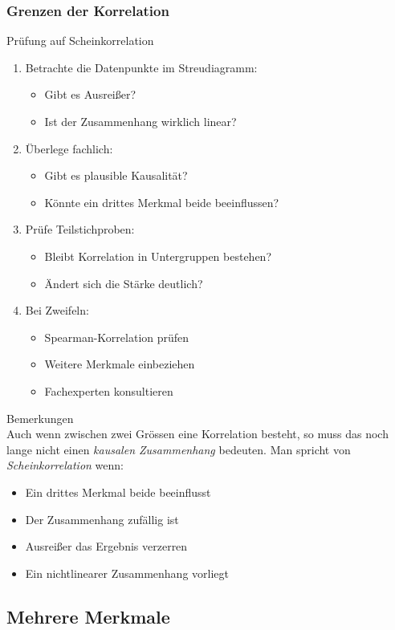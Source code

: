 \subsubsection{Grenzen der Korrelation}

\begin{KR}{Prüfung auf Scheinkorrelation}
    \begin{enumerate}
        \item Betrachte die Datenpunkte im Streudiagramm:
            \begin{itemize}
                \item Gibt es Ausreißer?
                \item Ist der Zusammenhang wirklich linear?
            \end{itemize}
        \item Überlege fachlich:
            \begin{itemize}
                \item Gibt es plausible Kausalität?
                \item Könnte ein drittes Merkmal beide beeinflussen?
            \end{itemize}
        \item Prüfe Teilstichproben:
            \begin{itemize}
                \item Bleibt Korrelation in Untergruppen bestehen?
                \item Ändert sich die Stärke deutlich?
            \end{itemize}
        \item Bei Zweifeln:
            \begin{itemize}
                \item Spearman-Korrelation prüfen
                \item Weitere Merkmale einbeziehen
                \item Fachexperten konsultieren
            \end{itemize}
    \end{enumerate}
    \end{KR}
    
    \begin{remark}{Bemerkungen}\\
    Auch wenn zwischen zwei Grössen eine Korrelation besteht, so muss das noch lange nicht einen \emph{kausalen Zusammenhang} bedeuten. Man spricht von \emph{Scheinkorrelation} wenn:
    \begin{itemize}
        \item Ein drittes Merkmal beide beeinflusst
        \item Der Zusammenhang zufällig ist
        \item Ausreißer das Ergebnis verzerren
        \item Ein nichtlinearer Zusammenhang vorliegt
    \end{itemize}
    \end{remark}

\subsection{Mehrere Merkmale}
